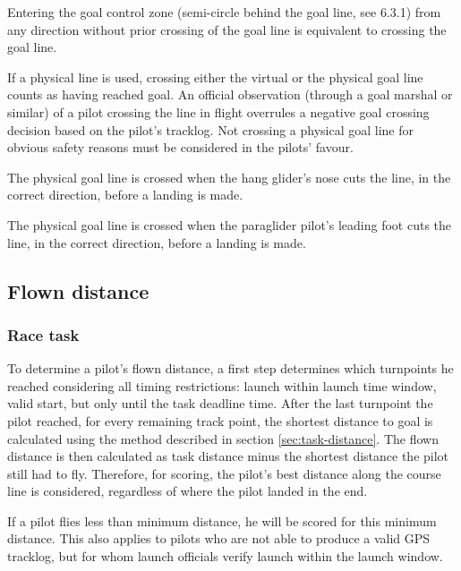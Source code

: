 \documentclass{article}
\begin{document}
\begin{pg}
Entering the goal control zone (semi-circle behind the goal line, see 6.3.1)
from any direction without prior crossing of the goal line is equivalent to
crossing the goal line.
\end{pg}

If a physical line is used, crossing either the virtual or the physical goal
line counts as having reached goal. An official observation (through a goal
marshal or similar) of a pilot crossing the line in flight overrules a negative
goal crossing decision based on the pilot’s tracklog. Not crossing a physical
goal line for obvious safety reasons must be considered in the pilots’ favour.

\begin{hg}
The physical goal line is crossed when the hang glider’s nose cuts the line, in
the correct direction, before a landing is made.
\end{hg}

\begin{pg}
The physical goal line is crossed when the paraglider pilot’s leading foot cuts
the line, in the correct direction, before a landing is made.
\end{pg}

\subsection{Flown distance}

\subsubsection{Race task}
\label{sec:race-task}
To determine a pilot’s flown distance, a first step determines which turnpoints
he reached considering all timing restrictions: launch within launch time
window, valid start, but only until the task deadline time. After the last
turnpoint the pilot reached, for every remaining track point, the shortest
distance to goal is calculated using the method described in section
\ref{sec:task-distance}. The flown distance is then calculated as task distance
minus the shortest distance the pilot still had to fly. Therefore, for scoring,
the pilot’s best distance along the course line is considered, regardless of
where the pilot landed in the end.

If a pilot flies less than minimum distance, he will be scored for this minimum
distance. This also applies to pilots who are not able to produce a valid GPS
tracklog, but for whom launch officials verify launch within the launch window.
\end{document}
